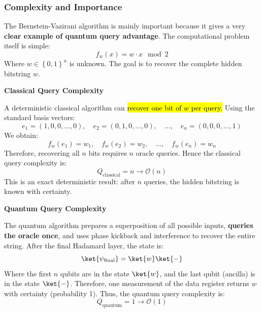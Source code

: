 \subsubsection{Complexity and Importance}\label{sec:bernstein-vazirani-complexity-and-importance}

The Bernstein-Vazirani algorithm is mainly important because it gives a very \textbf{clear example of quantum query advantage}. The computational problem itself is simple:
\begin{equation*}
    f_w(x) = w \cdot x \mod 2
\end{equation*}
Where $w \in \left\{0,1\right\}^n$ is unknown. The goal is to recover the complete hidden bitstring $w$.

\highspace
\begin{flushleft}
    \textcolor{Red2}{ \textbf{Classical Query Complexity}}
\end{flushleft}
A deterministic classical algorithm can \hl{recover one bit of $w$ per query.} Using the standard basis vectors:
\begin{equation*}
    e_1 = (1,0,0,\ldots,0), \quad e_2 = (0,1,0,\ldots,0), \quad \ldots, \quad e_n = (0,0,0,\ldots,1)
\end{equation*}
We obtain:
\begin{equation*}
    f_w(e_1) = w_1, \quad f_w(e_2) = w_2, \quad \ldots, \quad f_w(e_n) = w_n
\end{equation*}
Therefore, recovering all $n$ bits requires $n$ oracle queries. Hence the classical query complexity is:
\begin{equation*}
    Q_{\text{classical}} = n \rightarrow \mathcal{O}(n)
\end{equation*}
This is an exact deterministic result: after $n$ queries, the hidden bitstring is known with certainty.

\highspace
\begin{flushleft}
    \textcolor{Green3}{ \textbf{Quantum Query Complexity}}
\end{flushleft}
The quantum algorithm prepares a superposition of all possible inputs, \textbf{queries the oracle once}, and uses phase kickback and interference to recover the entire string. After the final Hadamard layer, the state is:
\begin{equation*}
    \ket{\psi_{\text{final}}} = \ket{w} \ket{-}
\end{equation*}
Where the first $n$ qubits are in the state $\ket{w}$, and the last qubit (ancilla) is in the state $\ket{-}$. Therefore, one measurement of the data register returns $w$ with certainty (probability 1). Thus, the quantum query complexity is:
\begin{equation*}
    Q_{\text{quantum}} = 1 \rightarrow \mathcal{O}(1)
\end{equation*}

